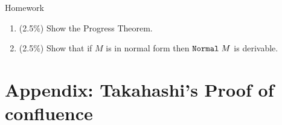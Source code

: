 
\begin{frame}{Homework}
  \begin{enumerate}
    \item (2.5\%) Show the Progress Theorem.
    \item (2.5\%) Show that if $M$ is in normal form then $\mathtt{Normal}\;M$ is derivable.
  \end{enumerate}
  
\end{frame}

%
%
% 
%

\appendix
\section{Appendix: Takahashi's Proof of confluence}

